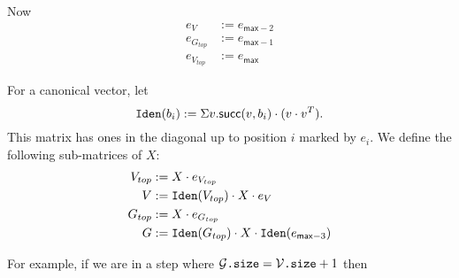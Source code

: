     Now 
    \begin{align*}
        e_{V}&:=e_{\mathsf{max}-2} \\
        e_{G_{top}}&:=e_{\mathsf{max}-1} \\
        e_{V_{top}}&:=e_{\mathsf{max}}
    \end{align*}

    For a canonical vector, let $$\texttt{Iden}(b_i):=\Sigma v. \mathsf{succ}(v,b_i)\cdot (v\cdot v^T).$$ This matrix has ones in the diagonal up to position $i$ marked by $e_{i}$. We define the following sub-matrices of $X$:
    \begin{align*}
        V_{top} &:= X\cdot e_{V_{top}} \\
        V &:= \texttt{Iden}(V_{top}) \cdot X \cdot e_V \\
        G_{top} &:=X\cdot e_{G_{top}} \\
        G &:= \texttt{Iden}(G_{top})\cdot X \cdot \texttt{Iden}(e_{\mathsf{max}-3})
    \end{align*}

    For example, if we are in a step where $\mathcal{G}\texttt{.size}=\mathcal{V}\texttt{.size} + 1$ then

